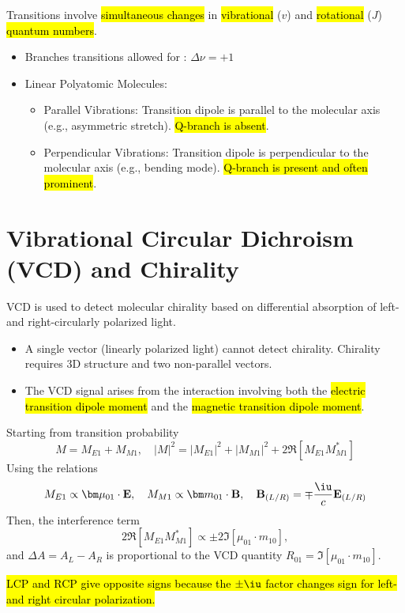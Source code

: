 Transitions involve \hl{simultaneous changes} in \hl{vibrational} ($v$) and
\hl{rotational} ($J$) \hl{quantum numbers}.
\begin{itemize}
  \item Branches transitions allowed for : $\Delta \nu = +1$
  \item Linear Polyatomic Molecules:
  \begin{itemize}
    \item Parallel Vibrations: Transition dipole is parallel to the molecular
    axis (e.g., asymmetric stretch). \hl{Q-branch is absent}.
    \item Perpendicular Vibrations: Transition dipole is perpendicular to the
    molecular axis (e.g., bending mode).
    \hl{Q-branch is present and often prominent}.
  \end{itemize}
\end{itemize}

\section{Vibrational Circular Dichroism (VCD) and Chirality}

VCD is used to detect molecular chirality based on differential absorption of
left- and right-circularly polarized light.
\begin{itemize}
  \item A single vector (linearly polarized light) cannot detect chirality.
  Chirality requires 3D structure and two non-parallel vectors.
  \item The VCD signal arises from the interaction involving both the
  \hl{electric transition dipole moment} and the
  \hl{magnetic transition dipole moment}.
\end{itemize}
Starting from transition probability
\[
  M = M_{E1} + M_{M1},\quad
  |M|^2 = |M_{E1}|^2 + |M_{M1}|^2 + 2\Re[M_{E1}M_{M1}^*]
\]
Using the relations
\[
  M_{E1} \propto \bm \mu_{01} \cdot \mathbf E,\quad
  M_{M1} \propto \bm   m_{01} \cdot \mathbf B, \quad
  \mathbf B_{(L/R)} = \mp \frac\iu c \mathbf E_{(L/R)}
\]
Then, the interference term
\[
  2\Re[M_{E1}M_{M1}^*] \propto \pm 2\Im[\mu_{01} \cdot m_{10}],
\]
and $\Delta A = A_L - A_R$ is proportional to the VCD quantity
$R_{01} = \Im[\mu_{01} \cdot m_{10}]$.
\begin{remark}
  \hl{LCP and RCP give opposite signs because the $\pm \iu$ factor changes sign
    for left- and right circular polarization.}
\end{remark}